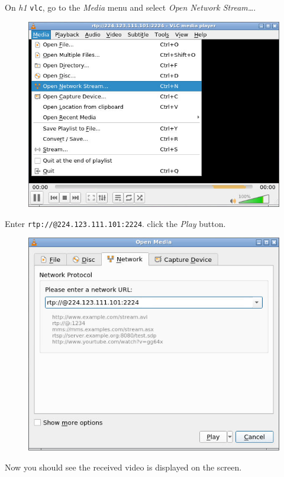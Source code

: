 \documentclass{../UTNetLab}
\begin{document}
    On \textit{h1} \lstinline{vlc},
    go to the \textit{Media} menu and select \textit{Open Network Stream\ldots}.
    \begin{figure}[H]
        \centering
        \includegraphics[scale=1.8]{img/open-network}
    \end{figure}
    Enter \texttt{rtp://@224.123.111.101:2224}.
    click the \textit{Play} button.
    \begin{figure}[H]
        \centering
        \includegraphics[scale=1.9]{img/network}
    \end{figure}

    Now you should see the received video is displayed on the screen.
\end{document}
